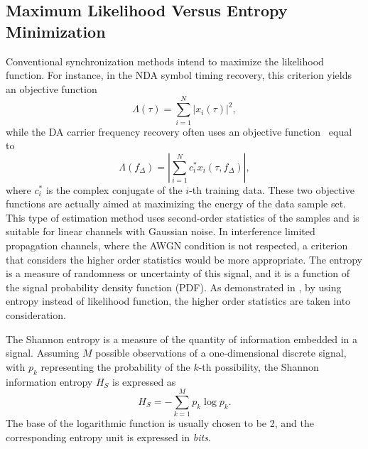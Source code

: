 \documentclass[journal,comsoc,onecolumn, 12pt,draftclsnofoot]{IEEEtran}
\begin{document}
\subsection{Maximum Likelihood Versus Entropy Minimization}
Conventional synchronization methods intend to maximize the likelihood function.
For instance, in the NDA symbol timing recovery, this criterion yields an objective function~\cite{mengali1997synchronization}
\begin{equation}
\Lambda(\tau) =\sum\limits_{i = 1}^N {{{\left| {{x_i}( \tau )} \right|}^2}}, 
\end{equation}
while the DA carrier frequency recovery often uses an objective function~\cite{mengali1997synchronization} equal to
\begin{equation}
\Lambda ({f_\Delta })=\left| \sum\limits_{i = 1}^N {{{{c_i^*{x_i}(\tau ,{f_\Delta })}}}} \right|, 
\end{equation}
where \(c_i^*\) is the complex conjugate of the \(i\)-th training data.
These two objective functions are actually aimed at maximizing the energy of the data sample set.
This type of estimation method uses second-order statistics of the samples and is suitable for linear channels with Gaussian noise.
In interference limited propagation channels, where the AWGN condition is not respected, a criterion that considers the higher order statistics would be more appropriate.
The entropy is a measure of randomness or uncertainty of this signal, and it is a function of the signal probability density function (PDF).
As demonstrated in \cite{Santamaria2002}, by using entropy instead of likelihood function, the higher order statistics are taken into consideration.

The Shannon entropy is a measure of the quantity of information  embedded in a signal.
Assuming \(M\) possible observations of a one-dimensional discrete signal, with \(p_k\) representing the probability of the \(k\)-th possibility, the Shannon information entropy \(H_S\) is expressed as \cite{Shannon1948}
\begin{equation}
H_S =  - \sum\limits_{k = 1}^M {{p_k}\log {p_k}}.
\label{eq:entropy}
\end{equation}
The base of the logarithmic function is usually chosen to be 2, and the corresponding entropy unit is expressed in \textit{bits}.
\end{document}
